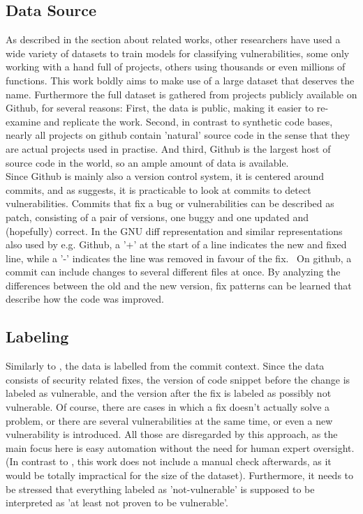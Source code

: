 \documentclass[
	a4paper,
	pagesize,
	pdftex,
	12pt,
	twoside, %
	BCOR=5mm, %
	ngerman,
	fleqn,
	final,
	]{scrartcl}
\begin{document}
\subsection{Data Source}\label{diff}
As described in the section about related works, other researchers have used a wide variety of datasets to train models for classifying vulnerabilities, some only working with a hand full of projects, others using thousands or even millions of functions. This work boldly aims to make use of a large dataset that deserves the name. Furthermore the full dataset is gathered from projects publicly available on Github, for several reasons: First, the data is public, making it easier to re-examine and replicate the work. Second, in contrast to synthetic code bases, nearly all projects on github contain 'natural' source code in the sense that they are actual projects used in practise. And third, Github is the largest host of source code in the world, so an ample amount of data is available.\\
Since Github is mainly also a version control system, it is centered around commits, and as \cite{Zhou.2017} suggests, it is practicable to look at commits to detect vulnerabilities. Commits that fix a bug or vulnerabilities can be described as patch, consisting of a pair of versions, one buggy and one updated and (hopefully) correct. In the GNU diff representation and similar representations also used by e.g. Github, a '+' at the start of a line indicates the new and fixed line, while a '-' indicates the line was removed in favour of the fix.~\cite{Liu.2018} On github, a commit can include changes to several different files at once. By analyzing the differences between the old and the new version, fix patterns can be learned that describe how the code was improved. \\

\subsection{Labeling}

Similarly to \cite{Li.2018}, the data is labelled from the commit context. Since the data consists of security related fixes, the version of code snippet before the change is labeled as vulnerable, and the version after the fix is labeled as possibly not vulnerable. Of course, there are cases in which a fix doesn't actually solve a problem, or there are several vulnerabilities at the same time, or even a new vulnerability is introduced. All those are disregarded by this approach, as the main focus here is easy automation without the need for human expert oversight. (In contrast to \cite{Li.2018}, this work does not include a manual check afterwards, as it would be totally impractical for the size of the dataset). Furthermore, it needs to be stressed that everything labeled as 'not-vulnerable' is supposed to be interpreted as 'at least not proven to be vulnerable'. 
\end{document}
